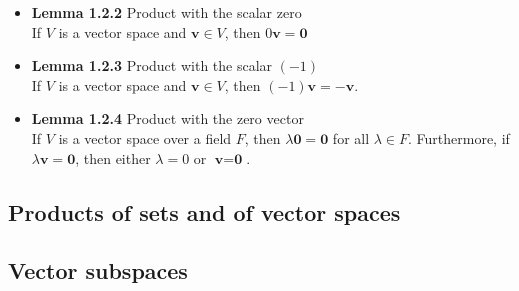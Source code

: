 \documentclass[11pt,a4paper]{article}
\begin{document}
\begin{itemize}
    \item \textbf{Lemma 1.2.2} Product with the scalar zero \\
        If $V$ is a vector space and $\textbf{v} \in V$, then $0\textbf{v} = \textbf{0}$

    \item \textbf{Lemma 1.2.3} Product with the scalar $(-1)$ \\
        If $V$ is a vector space and $\textbf{v} \in V$, then $(-1)\textbf{v} = -\textbf{v}$.

    \item \textbf{Lemma 1.2.4} Product with the zero vector \\
        If $V$ is a vector space over a field $F$, then $\lambda\textbf{0} = \textbf{0}$
        for all $\lambda \in F$.
        Furthermore, if $\lambda \textbf{v} = \textbf{0}$,
        then either $\lambda = 0$ or $\textbf{v} = \textbf{0}$.
\end{itemize}

\subsection{Products of sets and of vector spaces}

\subsection{Vector subspaces}
\end{document}
